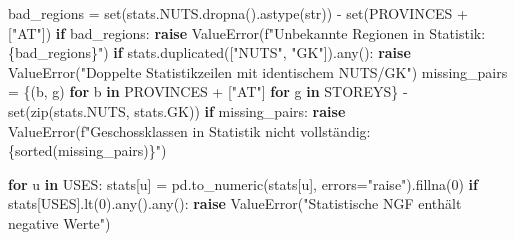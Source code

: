 \documentclass[
  ngerman,
  a4paper,
  DIV=11]{scrreprt}
\newenvironment{Shaded}{\begin{snugshade}}{\end{snugshade}}
\newcommand{\BuiltInTok}[1]{\textcolor[rgb]{0.00,0.23,0.31}{#1}}
\newcommand{\ControlFlowTok}[1]{\textcolor[rgb]{0.00,0.23,0.31}{\textbf{#1}}}
\newcommand{\DecValTok}[1]{\textcolor[rgb]{0.68,0.00,0.00}{#1}}
\newcommand{\KeywordTok}[1]{\textcolor[rgb]{0.00,0.23,0.31}{\textbf{#1}}}
\newcommand{\NormalTok}[1]{\textcolor[rgb]{0.00,0.23,0.31}{#1}}
\newcommand{\OperatorTok}[1]{\textcolor[rgb]{0.37,0.37,0.37}{#1}}
\newcommand{\PreprocessorTok}[1]{\textcolor[rgb]{0.68,0.00,0.00}{#1}}
\newcommand{\SpecialCharTok}[1]{\textcolor[rgb]{0.37,0.37,0.37}{#1}}
\newcommand{\SpecialStringTok}[1]{\textcolor[rgb]{0.13,0.47,0.30}{#1}}
\newcommand{\StringTok}[1]{\textcolor[rgb]{0.13,0.47,0.30}{#1}}
\begin{document}
\begin{Shaded}
\begin{Highlighting}[]
\NormalTok{bad\_regions }\OperatorTok{=} \BuiltInTok{set}\NormalTok{(stats.NUTS.dropna().astype(}\BuiltInTok{str}\NormalTok{)) }\OperatorTok{{-}} \BuiltInTok{set}\NormalTok{(PROVINCES }\OperatorTok{+}\NormalTok{ [}\StringTok{"AT"}\NormalTok{])}
\ControlFlowTok{if}\NormalTok{ bad\_regions:}
    \ControlFlowTok{raise} \PreprocessorTok{ValueError}\NormalTok{(}\SpecialStringTok{f"Unbekannte Regionen in Statistik: }\SpecialCharTok{\{}\NormalTok{bad\_regions}\SpecialCharTok{\}}\SpecialStringTok{"}\NormalTok{)}
\ControlFlowTok{if}\NormalTok{ stats.duplicated([}\StringTok{"NUTS"}\NormalTok{, }\StringTok{"GK"}\NormalTok{]).}\BuiltInTok{any}\NormalTok{():}
    \ControlFlowTok{raise} \PreprocessorTok{ValueError}\NormalTok{(}\StringTok{"Doppelte Statistikzeilen mit identischem NUTS/GK"}\NormalTok{)}
\NormalTok{missing\_pairs }\OperatorTok{=}\NormalTok{ \{(b, g) }\ControlFlowTok{for}\NormalTok{ b }\KeywordTok{in}\NormalTok{ PROVINCES }\OperatorTok{+}\NormalTok{ [}\StringTok{"AT"}\NormalTok{] }\ControlFlowTok{for}\NormalTok{ g }\KeywordTok{in}\NormalTok{ STOREYS\} }\OperatorTok{{-}} \BuiltInTok{set}\NormalTok{(}\BuiltInTok{zip}\NormalTok{(stats.NUTS, stats.GK))}
\ControlFlowTok{if}\NormalTok{ missing\_pairs:}
    \ControlFlowTok{raise} \PreprocessorTok{ValueError}\NormalTok{(}\SpecialStringTok{f"Geschossklassen in Statistik nicht vollständig: }\SpecialCharTok{\{}\BuiltInTok{sorted}\NormalTok{(missing\_pairs)}\SpecialCharTok{\}}\SpecialStringTok{"}\NormalTok{)}

\ControlFlowTok{for}\NormalTok{ u }\KeywordTok{in}\NormalTok{ USES:}
\NormalTok{    stats[u] }\OperatorTok{=}\NormalTok{ pd.to\_numeric(stats[u], errors}\OperatorTok{=}\StringTok{"raise"}\NormalTok{).fillna(}\DecValTok{0}\NormalTok{)}
\ControlFlowTok{if}\NormalTok{ stats[USES].lt(}\DecValTok{0}\NormalTok{).}\BuiltInTok{any}\NormalTok{().}\BuiltInTok{any}\NormalTok{():}
    \ControlFlowTok{raise} \PreprocessorTok{ValueError}\NormalTok{(}\StringTok{"Statistische NGF enthält negative Werte"}\NormalTok{)}


\end{Highlighting}
\end{Shaded}
\end{document}
